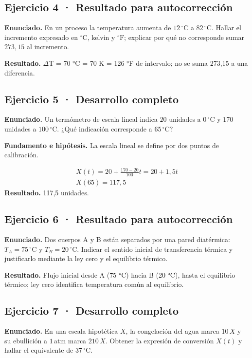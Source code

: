 \documentclass[11pt,a4paper]{article}
\begin{document}
\subsection*{Ejercicio 4 · Resultado para autocorrección}
\textbf{Enunciado.} En un proceso la temperatura aumenta de \(12\,^\circ\mathrm C\) a \(82\,^\circ\mathrm C\). Hallar el incremento expresado en \(^\circ\mathrm C\), kelvin y \(^\circ\mathrm F\); explicar por qué no corresponde sumar \(273{,}15\) al incremento.

\textbf{Resultado.} \ensuremath{\Delta}T = 70 °C = 70 K = 126 °F de intervalo; no se suma 273,15 a una diferencia.


\subsection*{Ejercicio 5 · Desarrollo completo}
\textbf{Enunciado.} Un termómetro de escala lineal indica \(20\) unidades a \(0\,^\circ\mathrm C\) y \(170\) unidades a \(100\,^\circ\mathrm C\). ¿Qué indicación corresponde a \(65\,^\circ\mathrm C\)?

\textbf{Fundamento e hipótesis.} La escala lineal se define por dos puntos de calibración.

\[
\begin{gathered}
X(t)=20+\frac{170-20}{100}t=20+1{,}5t\\X(65)=117{,}5
\end{gathered}
\]
\textbf{Resultado.} 117,5 unidades.


\subsection*{Ejercicio 6 · Resultado para autocorrección}
\textbf{Enunciado.} Dos cuerpos A y B están separados por una pared diatérmica: \(T_A=75\,^\circ\mathrm C\) y \(T_B=20\,^\circ\mathrm C\). Indicar el sentido inicial de transferencia térmica y justificarlo mediante la ley cero y el equilibrio térmico.

\textbf{Resultado.} Flujo inicial desde A (75 °C) hacia B (20 °C), hasta el equilibrio térmico; ley cero identifica temperatura común al equilibrio.


\subsection*{Ejercicio 7 · Desarrollo completo}
\textbf{Enunciado.} En una escala hipotética \(X\), la congelación del agua marca \(10\,X\) y su ebullición a \(1\,\mathrm{atm}\) marca \(210\,X\). Obtener la expresión de conversión \(X(t)\) y hallar el equivalente de \(37\,^\circ\mathrm C\).
\end{document}

